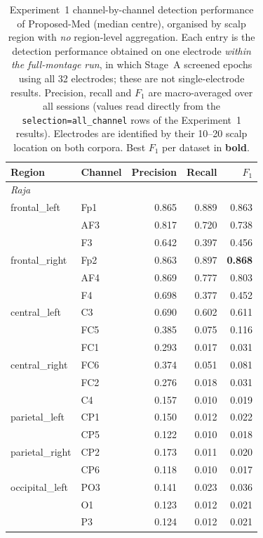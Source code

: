 \begin{table}[htbp]
\centering
\scriptsize
\setlength{\tabcolsep}{4pt}
\caption{Experiment~1 channel-by-channel detection performance of Proposed-Med (median centre), organised by scalp region with \emph{no} region-level aggregation. Each entry is the detection performance obtained on one electrode \emph{within the full-montage run}, in which Stage~A screened epochs using all 32 electrodes; these are not single-electrode results. Precision, recall and $F_1$ are macro-averaged over all sessions (values read directly from the \texttt{selection=all\_channel} rows of the Experiment~1 results). Electrodes are identified by their 10--20 scalp location on both corpora. Best $F_1$ per dataset in \textbf{bold}.}
\label{tab:exp1_channel_ablation}
\begin{tabular}{llrrr}
\toprule
Region & Channel & Precision & Recall & $F_1$ \\
\midrule
\multicolumn{5}{l}{\textit{Raja}} \\[2pt]
frontal\_left & Fp1 & 0.865 & 0.889 & 0.863 \\
 & AF3 & 0.817 & 0.720 & 0.738 \\
 & F3 & 0.642 & 0.397 & 0.456 \\
frontal\_right & Fp2 & 0.863 & 0.897 & \textbf{0.868} \\
 & AF4 & 0.869 & 0.777 & 0.803 \\
 & F4 & 0.698 & 0.377 & 0.452 \\
central\_left & C3 & 0.690 & 0.602 & 0.611 \\
 & FC5 & 0.385 & 0.075 & 0.116 \\
 & FC1 & 0.293 & 0.017 & 0.031 \\
central\_right & FC6 & 0.374 & 0.051 & 0.081 \\
 & FC2 & 0.276 & 0.018 & 0.031 \\
 & C4 & 0.157 & 0.010 & 0.019 \\
parietal\_left & CP1 & 0.150 & 0.012 & 0.022 \\
 & CP5 & 0.122 & 0.010 & 0.018 \\
parietal\_right & CP2 & 0.173 & 0.011 & 0.020 \\
 & CP6 & 0.118 & 0.010 & 0.017 \\
occipital\_left & PO3 & 0.141 & 0.023 & 0.036 \\
 & O1 & 0.123 & 0.012 & 0.021 \\
 & P3 & 0.124 & 0.012 & 0.021 \\

\end{tabular}
\end{table}
